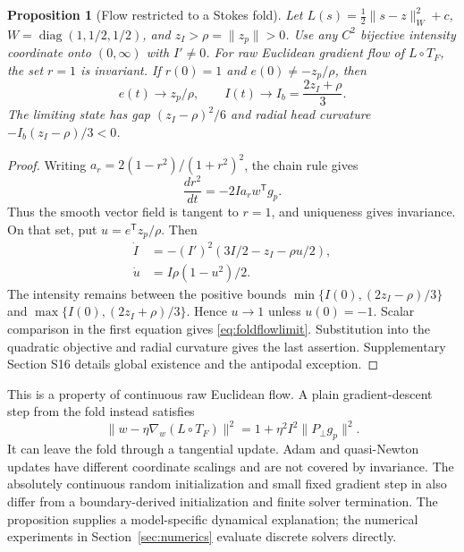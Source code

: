 \documentclass[pdflatex,sn-mathphys-num]{sn-jnl}
\newtheorem{proposition}[theorem]{Proposition}
\begin{document}
\begin{proposition}[Flow restricted to a Stokes fold]
\label{prop:restrictedflow}
Let $L(s)=\tfrac12\|s-z\|_W^2+c$, $W=\operatorname{diag}(1,1/2,1/2)$, and $z_I>\rho=\|z_p\|>0$. Use any $C^2$ bijective intensity coordinate onto $(0,\infty)$ with $I'\ne0$. For raw Euclidean gradient flow of $L\circ T_F$, the set $r=1$ is invariant. If $r(0)=1$ and $e(0)\ne-z_p/\rho$, then
\begin{equation}
 e(t)\longrightarrow z_p/\rho,\qquad
 I(t)\longrightarrow I_b=\frac{2z_I+\rho}{3}.
 \label{eq:foldflowlimit}
\end{equation}
The limiting state has gap $(z_I-\rho)^2/6$ and radial head curvature $-I_b(z_I-\rho)/3<0$.
\end{proposition}
\begin{proof}
Writing $a_r=2(1-r^2)/(1+r^2)^2$, the chain rule gives
\begin{equation}
 \frac{d r^2}{dt}=-2Ia_r w^{\mathsf T}g_p.
 \label{eq:radiusflow}
\end{equation}
Thus the smooth vector field is tangent to $r=1$, and uniqueness gives invariance. On that set, put $u=e^{\mathsf T}z_p/\rho$. Then
\begin{equation}
 \begin{aligned}
 \dot I&=-(I')^2(3I/2-z_I-\rho u/2),\\
 \dot u&=I\rho(1-u^2)/2.
 \end{aligned}
 \label{eq:restrictedflow}
\end{equation}
The intensity remains between the positive bounds $\min\{I(0),(2z_I-\rho)/3\}$ and $\max\{I(0),(2z_I+\rho)/3\}$. Hence $u\to1$ unless $u(0)=-1$. Scalar comparison in the first equation gives \eqref{eq:foldflowlimit}. Substitution into the quadratic objective and radial curvature gives the last assertion. Supplementary Section S16 details global existence and the antipodal exception.
\end{proof}

This is a property of continuous raw Euclidean flow. A plain gradient-descent step from the fold instead satisfies
\begin{equation}
 \|w-\eta\nabla_w(L\circ T_F)\|^2
 =1+\eta^2 I^2\|P_\perp g_p\|^2.
 \label{eq:discretefoldstep}
\end{equation}
It can leave the fold through a tangential update. Adam and quasi-Newton updates have different coordinate scalings and are not covered by invariance. The absolutely continuous random initialization and small fixed gradient step in \cite{lee} also differ from a boundary-derived initialization and finite solver termination. The proposition supplies a model-specific dynamical explanation; the numerical experiments in Section~\ref{sec:numerics} evaluate discrete solvers directly.
\end{document}
